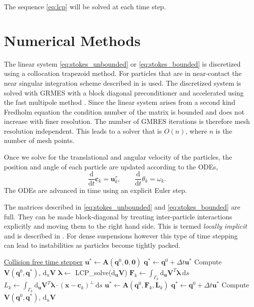 \documentclass[preprint, 10pt]{elsarticle}
\begin{document}
The sequence \eqref{eq:lcp} will be solved at each time step. 



		
\section{Numerical Methods\label{s:method}} 

The linear system \eqref{eq:stokes_unbounded} or \eqref{eq:stokes_bounded} is discretized using a collocation trapezoid method. For particles that are in near-contact the near singular integration scheme described in \cite{Quaife2014, Ying2006} is used. The discretized system is solved with GRMES \cite{Saad1986} with a block diagonal preconditioner and accelerated using the fast multipole method \cite{Greengard1987}.  Since the linear system arises from a second kind Fredholm equation the condition number of the matrix is bounded and does not increase with finer resolution. The number of GMRES iterations is therefore mesh resolution independent. This leads to a solver that is $O(n)$, where $n$ is the number of mesh points. 

Once we solve for the translational and angular velocity of the particles, the position and angle of each particle are updated according to the ODEs,
\[ \frac{\text{d}}{\text{d}t}\mathbf{c}_k = \mathbf{u}^\tau_k, \qquad \frac{\text{d}}{\text{d}t}\theta_k =\omega_k.\]
The ODEs are advanced in time using an explicit Euler step. 

The matrices described in \eqref{eq:stokes_unbounded} and \eqref{eq:stokes_bounded} are full. They can be made block-diagonal by treating inter-particle interactions explicitly and moving them to the right hand side. This is termed \textit{locally implicit} and is described in \cite{Lu2017}. For dense suspensions however this type of time stepping can lead to instabilities as particles become tightly packed. 

\begin{algorithm}

  	  \underline{Collision free time stepper}\;
	 $\mathbf{u}^* \gets \mathbf{A}(\mathbf{q}^0,\mathbf{0},\mathbf{0})$\;
	$\mathbf{q}^* \gets \mathbf{q}^0 + \Delta t \mathbf{u}^*$\;
	Compute $\mathbf{V}(\mathbf{q}^0,\mathbf{q}^*)$, $\text{d}_u\mathbf{V}$\;
	{
		$\pmb{\lambda} \gets$ LCP\_solve($\text{d}_{\mathbf{u}}\mathbf{V}$)\;
		$\mathbf{F}_k \gets \int_{\Gamma_k} \text{d}_{\mathbf{u}}\mathbf{V}^T\pmb{\lambda}~\text{d}s$\;
		$L_k \gets \int_{\Gamma_k} \text{d}_{\mathbf{u}}\mathbf{V}^T\pmb{\lambda}\cdot(\mathbf{x}-\mathbf{c}_k)^\perp~\text{d}s$\;
		$\mathbf{u}^* \gets \mathbf{A}(\mathbf{q}^0,\mathbf{F}_k,\mathbf{L}_k)$\;
		$\mathbf{q}^* \gets \mathbf{q}^0 + \Delta t \mathbf{u}^*$\;
		Compute $\mathbf{V}(\mathbf{q}^0,\mathbf{q}^*)$, $\text{d}_u\mathbf{V}$\;
	}
\end{algorithm}
\end{document}
